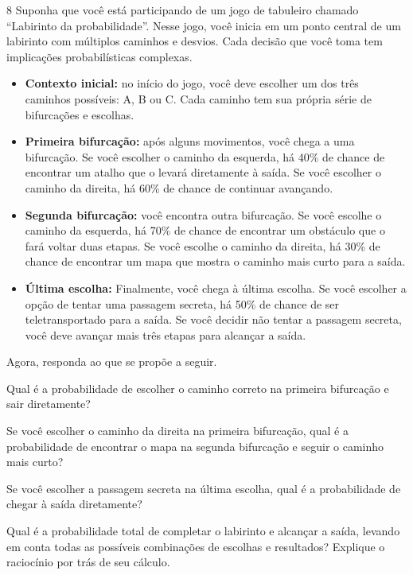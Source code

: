 \num{8} Suponha que você está participando de um jogo de tabuleiro
chamado ``Labirinto da probabilidade''. Nesse jogo, você inicia em um
ponto central de um labirinto com múltiplos caminhos e desvios. Cada decisão
que você toma tem implicações probabilísticas complexas.

\begin{itemize}
\item \textbf{Contexto inicial:} no início do jogo, você deve escolher um dos três
   caminhos possíveis: A, B ou C. Cada caminho tem sua própria série de
   bifurcações e escolhas.

\item \textbf{Primeira bifurcação:} após alguns movimentos, você chega a uma
   bifurcação. Se você escolher o caminho da esquerda, há 40\% de chance de
   encontrar um atalho que o levará diretamente à saída. Se você escolher o caminho
   da direita, há 60\% de chance de continuar avançando.

\item \textbf{Segunda bifurcação:} você encontra outra bifurcação. Se você
   escolhe o caminho da esquerda, há 70\% de chance de encontrar um obstáculo que
   o fará voltar duas etapas. Se você escolhe o caminho da direita, há 30\% de chance
   de encontrar um mapa que mostra o caminho mais curto para a saída.

\item \textbf{Última escolha:} Finalmente, você chega à última escolha. Se você
   escolher a opção de tentar uma passagem secreta, há 50\% de chance de ser teletransportado
   para a saída. Se você decidir não tentar a passagem secreta, você deve
   avançar mais três etapas para alcançar a saída.
\end{itemize}

Agora, responda ao que se propõe a seguir.

\begin{escolha}
\item Qual é a probabilidade de escolher o caminho correto na primeira
   bifurcação e sair diretamente?

\item Se você escolher o caminho da direita na primeira bifurcação, qual é a
   probabilidade de encontrar o mapa na segunda bifurcação e seguir o caminho
   mais curto?

\item Se você escolher a passagem secreta na última escolha, qual é a
   probabilidade de chegar à saída diretamente?

\item Qual é a probabilidade total de completar o labirinto e alcançar a saída,
   levando em conta todas as possíveis combinações de escolhas e resultados?
   Explique o raciocínio por trás de seu cálculo.
\end{escolha}

